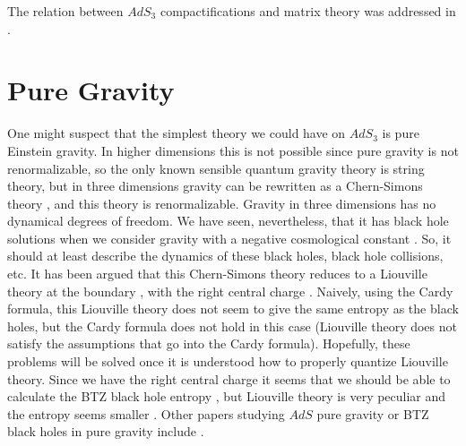 The relation between $AdS_3$ compactifications and 
matrix theory 
\cite{Banks:1997vh} was addressed in \cite{Hosomichi:1999uj}.



 
\section{Pure Gravity}

One might suspect that the simplest theory we could have on 
$AdS_3$ is pure Einstein gravity. 
In higher dimensions this is not possible since pure gravity  is not
renormalizable, so the only known sensible quantum gravity theory is
string theory, but in three dimensions gravity can be rewritten 
as a Chern-Simons theory \cite{Witten:1988hc,Witten:1989sx},
 and this theory is renormalizable.
Gravity in three dimensions has no dynamical degrees of freedom. 
We have seen, nevertheless,  that it has black hole solutions
when we consider gravity with a negative cosmological constant 
\cite{Banados:1992wn}
\lorbtz . So, it should at least describe the dynamics of these
black holes, black hole collisions, etc. 
It has been argued that this Chern-Simons theory 
reduces to a Liouville theory at the boundary 
\cite{Coussaert:1995zp,Banados:1998ta,Banados:1996tn,Oh:1998sv},
 with the right central
charge \brown . Naively, using the Cardy formula, 
this Liouville theory does not seem to 
give the same entropy as the black holes, but the Cardy formula
does not hold in this case (Liouville theory does not satisfy the
assumptions that go into the Cardy formula). 
Hopefully, these problems will be solved
once it is understood how to properly quantize Liouville theory. 
Since we have the right central charge it seems that
we should be able to calculate the BTZ black hole entropy 
\cite{Strominger:1998eq}, but Liouville theory is very peculiar
and the entropy seems smaller \cite{Carlip:1998qw}. 
Other papers studying $AdS$ pure gravity or BTZ black holes in
pure gravity include   
\cite{Banados:1998gg,Martinec:1998wm,Myung:1998fw,Behrndt:1998wg,%
Emparan:1998qp,Lee:1998qe,Navarro-Salas:1998ks,Navarro-Salas:1999sr,%
Nakatsu:1999wt,Chekhov:1999uk,Chandia:1998uf,Banados:1999ir,%
Brotz:1999xx,Park:1999nc,Banados:1998gz,Yoshida:1999sh,Cho:1999xj,%
Mano:1999xs,Banados:1998sm,Birmingham:1998pn,Hyun:1999vg}.

